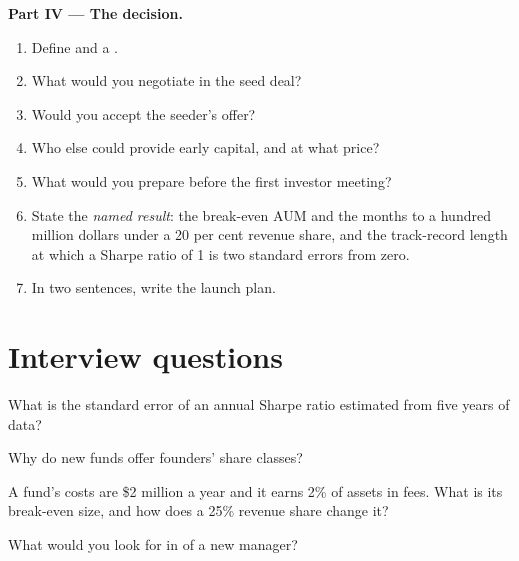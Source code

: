 \begin{problem}
\medskip\noindent\textbf{Part IV --- The decision.}
\begin{enumerate}[resume]
\item Define  and a .
\item What would you negotiate in the seed deal?
\item Would you accept the seeder's offer?
\item Who else could provide early capital, and at what price?
\item What would you prepare before the first investor meeting?
\item State the \emph{named result}: the break-even AUM and the months to a hundred million dollars under a 20 per cent revenue share, and the
track-record length at which a Sharpe ratio of 1 is two standard errors from zero.
\item In two sentences, write the launch plan.
\end{enumerate}
\end{problem}

\section{Interview questions}

\begin{interviewq}\label{iq:fm:launching-a-fund-and-raising-capital:1}
What is the standard error of an annual Sharpe ratio estimated from five years of data?
\end{interviewq}

\begin{interviewq}\label{iq:fm:launching-a-fund-and-raising-capital:2}
Why do new funds offer founders' share classes?
\end{interviewq}

\begin{interviewq}\label{iq:fm:launching-a-fund-and-raising-capital:3}
A fund's costs are \$2 million a year and it earns 2\% of assets in fees. What is its break-even size, and how does a 25\% revenue share change it?
\end{interviewq}

\begin{interviewq}\label{iq:fm:launching-a-fund-and-raising-capital:4}
What would you look for in  of a new manager?
\end{interviewq}

